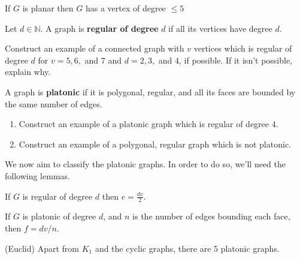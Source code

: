 \begin{theorem} If $G$ is planar then $G$ has a vertex of degree $\leq 5$
\end{theorem}

\begin{definition} Let $d\in \mathbb{N}$.  A graph is \textbf{regular of degree} $d$ if all its vertices have degree $d$.
\end{definition}

\begin{examples} Construct an example of a connected graph with $v$ vertices which is regular of degree $d$ for $v = 5, 6,$ and $7$ and $d=2, 3,$ and $4$, if possible.  If it isn't possible, explain why.
\end{examples}

\begin{definition} A graph is \textbf{platonic} if it is polygonal, regular, and all its faces are bounded by the same number of edges.
\end{definition}

\begin{examples}\leavevmode
\begin{enumerate}
    \item Construct an example of a platonic graph which is regular of degree $4$.
    \item Construct an example of a polygonal, regular graph which is not platonic.
\end{enumerate}
\end{examples}

We now aim to classify the platonic graphs.  In order to do so, we'll need the following lemmas.

\begin{lemma} If $G$ is regular of degree $d$ then $e=\frac{dv}{2}$.
\end{lemma}

\begin{lemma} If $G$ is platonic of degree $d$, and $n$ is the number of edges bounding each face, then $f = dv/n$.
\end{lemma}

\begin{theorem}(Euclid) Apart from $K_1$ and the cyclic graphs, there are 5 platonic graphs.
\end{theorem}
